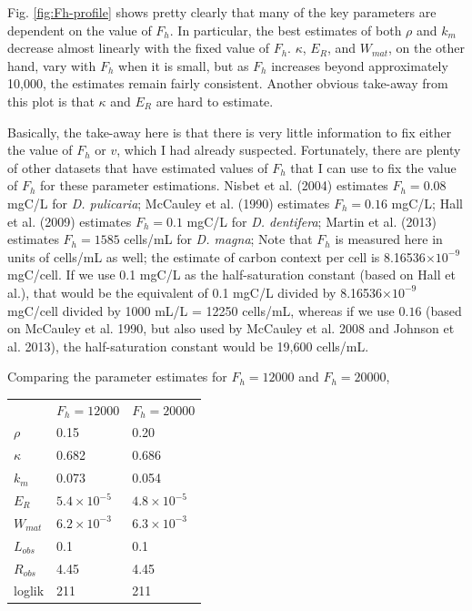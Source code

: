 \documentclass[12pt,reqno,final,pdftex]{amsart}\usepackage[]{graphicx}\usepackage[]{color}
\theoremstyle{plain}
\numberwithin{equation}{part}
\begin{document}
Fig. \ref{fig:Fh-profile} shows pretty clearly that many of the key parameters are dependent on the value of $F_h$.
In particular, the best estimates of both $\rho$ and $k_m$ decrease almost linearly with the fixed value of $F_h$.
$\kappa$, $E_R$, and $W_{mat}$, on the other hand, vary with $F_h$ when it is small, but as $F_h$ increases beyond approximately 10,000, the estimates remain fairly consistent.
Another obvious take-away from this plot is that $\kappa$ and $E_R$ are hard to estimate.

Basically, the take-away here is that there is very little information to fix either the value of $F_h$ or $v$, which I had already suspected.
Fortunately, there are plenty of other datasets that have estimated values of $F_h$ that I can use to fix the value of $F_h$ for these parameter estimations.
Nisbet et al. (2004) estimates $F_h = 0.08$ mgC/L for \emph{D. pulicaria}; McCauley et al. (1990) estimates $F_h = 0.16$ mgC/L; Hall et al. (2009) estimates $F_h = 0.1$ mgC/L for \emph{D. dentifera}; Martin et al. (2013) estimates $F_h = 1585$ cells/mL for \emph{D. magna};
Note that $F_h$ is measured here in units of cells/mL as well; the estimate of carbon context per cell is 8.16536$\times 10^{-9}$ mgC/cell.
If we use 0.1 mgC/L as the half-saturation constant (based on Hall et al.), that would be the equivalent of 0.1 mgC/L divided by 8.16536$\times 10^{-9}$ mgC/cell divided by 1000 mL/L = 12250 cells/mL, whereas if we use $0.16$ (based on McCauley et al. 1990, but also used by McCauley et al. 2008 and Johnson et al. 2013), the half-saturation constant would be 19,600 cells/mL.

Comparing the parameter estimates for $F_h = 12000$ and $F_h = 20000$,

\begin{tabular}{l | l | l}
& $F_h = 12000$ & $F_h = 20000$ \\
$\rho$ & 0.15 & 0.20 \\
$\kappa$ & 0.682 & 0.686 \\
$k_m$ & 0.073 & 0.054 \\
$E_R$ & $5.4 \times 10^{-5}$ & $4.8 \times 10^{-5}$ \\
$W_{mat}$ & $6.2 \times 10^{-3}$ & $6.3 \times 10^{-3}$ \\
$L_{obs}$ & 0.1 & 0.1 \\
$R_{obs}$ & 4.45 & 4.45 \\
loglik & 211 & 211
\end{tabular}
\end{document}
